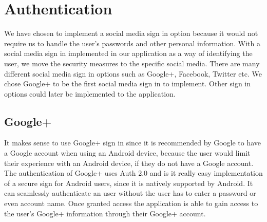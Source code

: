 \section{Authentication}
We have chosen to implement a social media sign in option because it would not require us to handle the user's passwords and other personal information. With a social media sign in implemented in our application as a way of identifying the user, we move the security measures to the specific social media.
There are many different social media sign in options such as Google+, Facebook, Twitter etc. We chose Google+ to be the first social media sign in to implement. Other sign in options could later be implemented to the application.

\subsection{Google+}
It makes sense to use Google+ sign in since it is recommended by Google to have a Google account when using an Android device, because the user would limit their experience with an Android device, if they do not have a Google account. 
The authentication of Google+ uses Auth 2.0 and is it really easy implementation of a secure sign for Android users, since it is natively supported by Android. 
It can seamlessly authenticate an user without the user has to enter a password or even account name. 
Once granted access the application is able to gain access to the user's Google+ information through their Google+ account.\cite{googleplusvideo}

